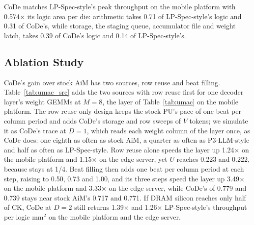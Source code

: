CoDe matches LP-Spec-style's peak throughput on the mobile platform with 0.574$\times$ its logic area per die: arithmetic takes
0.71 of LP-Spec-style's logic and 0.31 of CoDe's, while storage, the staging queue, accumulator file and weight latch,
takes 0.39 of CoDe's logic and 0.14 of LP-Spec-style's.

\subsection{Ablation Study}
\label{sec:eval:ablation}

\begin{table}[t]
  \caption{Useful-MAC utilization from stock AiM to CoDe, one step at a time.}
  \label{tab:umac_src}
  \centering
  \footnotesize
  \setlength{\tabcolsep}{4pt}
  
\end{table}

CoDe's gain over stock AiM has two sources, row reuse and beat filling. Table~\ref{tab:umac_src} adds the two sources with row reuse first for one decoder layer's weight GEMMs at $M = 8$, the layer of Table~\ref{tab:umac} on the mobile platform. The row-reuse-only design keeps the stock PU's pace of one beat per column
period and adds CoDe's storage and row sweeps of $V$ tokens; we simulate it as CoDe's trace at $D = 1$, which reads
each weight column of the layer once, as CoDe does: one eighth as often as stock AiM, a quarter as often as
P3-LLM-style and half as often as LP-Spec-style. Row reuse alone speeds
the layer up 1.24$\times$ on the mobile platform and 1.15$\times$ on the edge server, yet $U$ reaches 0.223 and
0.222, because \UMAC stays at 1/4. Beat filling then adds one beat per column period at each step, raising \UMAC to
0.50, 0.73 and 1.00, and its three steps
speed the layer up 3.49$\times$ on the mobile platform and 3.33$\times$ on the edge server, while CoDe's \fMAC of 0.779 and 0.739 stays
near stock AiM's 0.717 and 0.771. If DRAM silicon reaches only half of CK, CoDe at $D = 2$ still
returns 1.39$\times$ and 1.26$\times$ LP-Spec-style's throughput per logic mm$^2$ on the mobile platform and the edge server.

